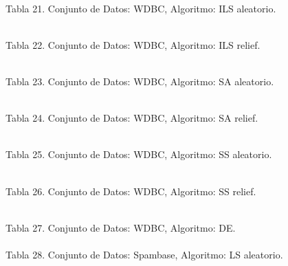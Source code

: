 \documentclass{ci5652}
\begin{document}
\begin{adjustbox}{width=\columnwidth, center=\columnwidth}
%
\\
\end{adjustbox}
Tabla 21. Conjunto de Datos: WDBC, Algoritmo: ILS aleatorio.

\begin{adjustbox}{width=\columnwidth, center=\columnwidth}
%
\\
\end{adjustbox}
Tabla 22. Conjunto de Datos: WDBC, Algoritmo: ILS relief.

\begin{adjustbox}{width=\columnwidth, center=\columnwidth}
%
\\
\end{adjustbox}
Tabla 23. Conjunto de Datos: WDBC, Algoritmo: SA aleatorio.

\begin{adjustbox}{width=\columnwidth, center=\columnwidth}
%
\\
\end{adjustbox}
Tabla 24. Conjunto de Datos: WDBC, Algoritmo: SA relief.

\begin{adjustbox}{width=\columnwidth, center=\columnwidth}
%
\\
\end{adjustbox}
Tabla 25. Conjunto de Datos: WDBC, Algoritmo: SS aleatorio.

%
\\
Tabla 26. Conjunto de Datos: WDBC, Algoritmo: SS relief.

%
\\
Tabla 27. Conjunto de Datos: WDBC, Algoritmo: DE.\\

%
\\
Tabla 28. Conjunto de Datos: Spambase, Algoritmo: LS aleatorio.\\
\end{document}
